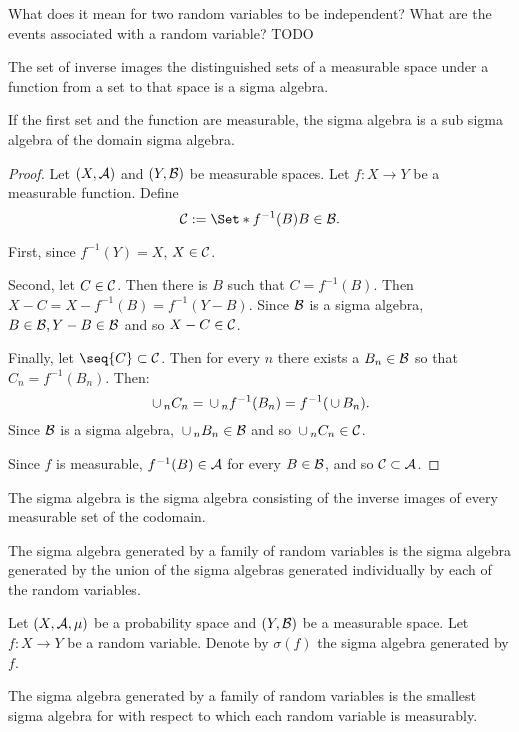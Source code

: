 

What does it mean for
two random variables to
be independent?
What are the events associated
with a random variable?
TODO


\begin{prop}

The set of inverse images
the distinguished sets
of a measurable space under
a function from a set to
that space is a sigma algebra.

If the first set and the
function are measurable,
the sigma algebra is a sub
sigma algebra of the domain
sigma algebra.

\begin{proof}
  Let $(X, \mathcal{A})$
  and $(Y, \mathcal{B})$ be
  measurable spaces.
  Let $f: X \to Y$
  be a measurable function.
  Define
  \[
    \SC := \Set*{f^{-1}(B)}{B \in \SB}.
  \]

  First,
  since $f^{-1}(Y) = X$,
  $X \in \mathcal{C}$.

  Second, let $C \in \mathcal{C}$.
  Then there is $B$ such that
  $C = f^{-1}(B)$.
  Then $X - C = X - f^{-1}(B) = f^{-1}(Y - B)$.
  Since $\mathcal{B}$ is a sigma algebra,
  $B \in \mathcal{B}, Y - B \in \mathcal{B}$ and so
  $X - C \in \mathcal{C}$.

  Finally, let $\seq{C} \subset \SC$.
  Then for every $n$ there exists
  a $B_n \in \mathcal{B}$ so that $C_n = f^{-1}(B_n)$.
  Then:
  \[
    \,\cup\,_{n} C_n = \,\cup\,_n f^{-1}(B_n) = f^{-1}(\,\cup\, B_n).
  \]
  Since $\mathcal{B}$ is a sigma algebra,
  $\,\cup\,_n B_n \in \mathcal{B}$ and so $\,\cup\,_{n} C_n \in \mathcal{C}$.

  Since $f$ is measurable,
  $f^{-1}(B) \in \mathcal{A}$ for
  every $B \in \mathcal{B}$, and so $\mathcal{C} \subset \mathcal{A}$.
\end{proof}
\end{prop}

The sigma algebra
is the sigma algebra consisting
of the inverse images of every measurable
set of the codomain.

The sigma algebra generated
by a family of random variables
is the sigma algebra generated
by the union of the sigma algebras
generated individually by each
of the random variables.


Let $(X, \mathcal{A}, \mu)$ be a probability
space and $(Y, \mathcal{B})$ be a measurable
space.
Let $f: X \to Y$ be a random variable.
Denote by $\sigma(f)$ the
sigma algebra generated by $f$.


\begin{prop}
  The sigma algebra generated
  by a family of random variables
  is the smallest sigma algebra
  for with respect to which each
  random variable is measurably.
\end{prop}
